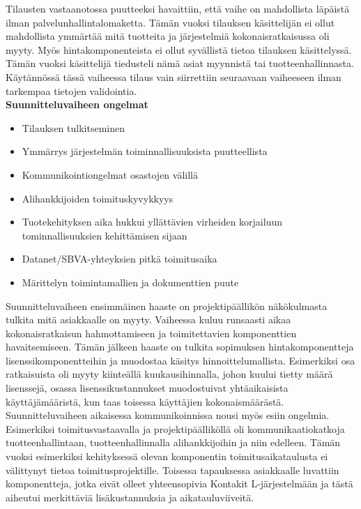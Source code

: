 \documentclass[finnish,12pt,a4paper,pdftex]{article}
\begin{document}
\noindent Tilausten vastaanotossa puutteeksi havaittiin, että vaihe on mahdollista läpäistä ilman palvelunhallintalomaketta. Tämän vuoksi tilauksen käsittelijän ei ollut mahdollista ymmärtää mitä tuotteita ja järjestelmiä kokonaisratkaisussa oli myyty. Myös hintakomponenteista ei ollut syvällistä tietoa tilauksen käsittelyssä. Tämän vuoksi käsittelijä tiedusteli nämä asiat myynnistä tai tuotteenhallinnasta. Käytännössä tässä vaiheessa tilaus vain siirrettiin seuraavaan vaiheeseen ilman tarkempaa tietojen validointia.\\

\textbf{Suunnitteluvaiheen ongelmat}\\
\begin{itemize}
    \item Tilauksen tulkitseminen
    \item Ymmärrys järjestelmän toiminnallisuuksista puutteellista
    \item Kommunikointiongelmat osastojen välillä
    \item Alihankkijoiden toimituskyvykkyys
    \item Tuotekehityksen aika hukkui yllättävien virheiden korjailuun tominnallisuuksien kehittämisen sijaan
    \item Datanet/SBVA-yhteyksien pitkä toimitusaika
    \item Märittelyn toimintamallien ja dokumenttien puute
\end{itemize}

\noindent Suunnitteluvaiheen ensimmäinen haaste on projektipäällikön näkökulmasta tulkita mitä asiakkaalle on myyty. Vaiheessa kuluu runsaasti aikaa kokonaisratkaisun hahmottamiseen ja toimitettavien komponenttien havaitsemiseen. Tämän jälkeen haaste on tulkita sopimuksen hintakomponentteja lisenssikomponentteihin ja muodostaa käsitys hinnoittelumallista. Esimerkiksi osa ratkaisuista oli myyty kiinteällä kuukausihinnalla, johon kuului tietty määrä lisenssejä, osassa  lisenssikustannukset muodostuivat yhtäaikaisista käyttäjämääristä, kun taas toisessa käyttäjien kokonaismäärästä.\\

\noindent Suunnitteluvaiheen aikaisessa kommunikoinnissa nousi myös esiin ongelmia. Esimerkiksi toimitusvastaavalla ja projektipäälliköllä oli kommunikaatiokatkoja tuotteenhallintaan, tuotteenhallinnalla alihankkijoihin ja niin edelleen. Tämän vuoksi esimerkiksi kehityksessä olevan komponentin toimitusaikataulusta ei välittynyt tietoa toimitusprojektille. Toisessa tapauksessa asiakkaalle luvattiin komponentteja, jotka eivät olleet yhteensopivia Kontakit L-järjestelmään ja tästä aiheutui merkittäviä lisäkustannuksia ja aikatauluviiveitä.\\
\end{document}
